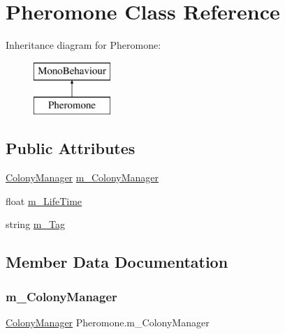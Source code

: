 \hypertarget{class_pheromone}{}\section{Pheromone Class Reference}
\label{class_pheromone}
Inheritance diagram for Pheromone\+:\begin{figure}[H]
\begin{center}
\leavevmode
\includegraphics[height=2.000000cm]{class_pheromone}
\end{center}
\end{figure}
\subsection*{Public Attributes}
\begin{DoxyCompactItemize}
\item 
\mbox{\hyperlink{class_colony_manager}{Colony\+Manager}} \mbox{\hyperlink{class_pheromone_ad21f1a6db46a829e9ebffa3d37a5a712}{m\+\_\+\+Colony\+Manager}}
\item 
float \mbox{\hyperlink{class_pheromone_a5069c181afb9e728c317f072156ed365}{m\+\_\+\+Life\+Time}}
\item 
string \mbox{\hyperlink{class_pheromone_a340a83641b17cda871cdcc0a89855e84}{m\+\_\+\+Tag}}
\end{DoxyCompactItemize}


\subsection{Member Data Documentation}
\mbox{\label{class_pheromone_ad21f1a6db46a829e9ebffa3d37a5a712}} 
\subsubsection{\texorpdfstring{m\_ColonyManager}{m\_ColonyManager}}
{\footnotesize\ttfamily \mbox{\hyperlink{class_colony_manager}{Colony\+Manager}} Pheromone.\+m\+\_\+\+Colony\+Manager}

\mbox{\label{class_pheromone_a5069c181afb9e728c317f072156ed365}} 
